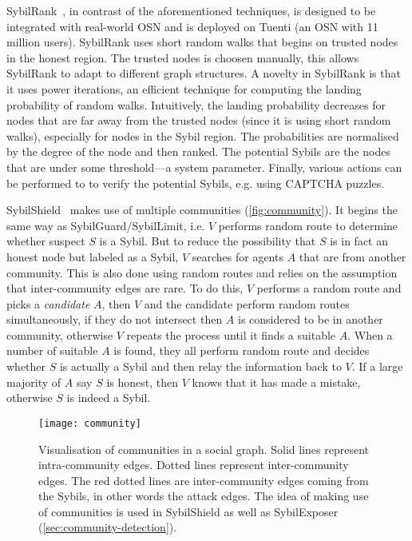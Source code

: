 
SybilRank~\cite{cao2012aiding}, in contrast of the aforementioned techniques, is
designed to be integrated with real-world OSN and is deployed on Tuenti (an OSN
with 11 million users). SybilRank uses short random walks that begins on trusted
nodes in the honest region. The trusted nodes is choosen manually, this allows
SybilRank to adapt to different graph structures. A novelty in SybilRank is that
it uses power iterations, an efficient technique for computing the landing
probability of random walks. Intuitively, the landing probability decreases for
nodes that are far away from the trusted nodes (since it is using short random
walks), especially for nodes in the Sybil region. The probabilities are
normalised by the degree of the node and then ranked. The potential Sybils are
the nodes that are under some threshold---a system parameter. Finally, various
actions can be performed to to verify the potential Sybils, e.g. using CAPTCHA
puzzles.

SybilShield~\cite{shi2013sybilshield} makes use of multiple communities
(\autoref{fig:community}). It begins the same way as
SybilGuard/SybilLimit, i.e. $V$ performs random route to determine whether
suspect $S$ is a Sybil. But to reduce the possibility that $S$ is in fact an
honest node but labeled as a Sybil, $V$ searches for agents $A$ that are from
another community. This is also done using random routes and relies on the
assumption that inter-community edges are rare. To do this, $V$ performs a
random route and picks a \emph{candidate} $A$, then $V$ and the candidate
perform random routes simultaneously, if they do not intersect then $A$ is
considered to be in another community, otherwise $V$ repeats the process until
it finds a suitable $A$. When a number of suitable $A$ is found, they all
perform random route and decides whether $S$ is actually a Sybil and then relay
the information back to $V$. If a large majority of $A$ say $S$ is honest, then
$V$ knows that it has made a mistake, otherwise $S$ is indeed a Sybil.

\begin{figure}
  \centering
  \texttt{[image: community]}
  \caption{Visualisation of communities in a social graph. Solid lines represent
    intra-community edges. Dotted lines represent inter-community edges. The red
    dotted lines are inter-community edges coming from the Sybils, in other
    words the attack edges. The idea of making use of communities is used in
    SybilShield as well as SybilExposer
    (\autoref{sec:community-detection}).}
  \label{fig:community}
\end{figure}


